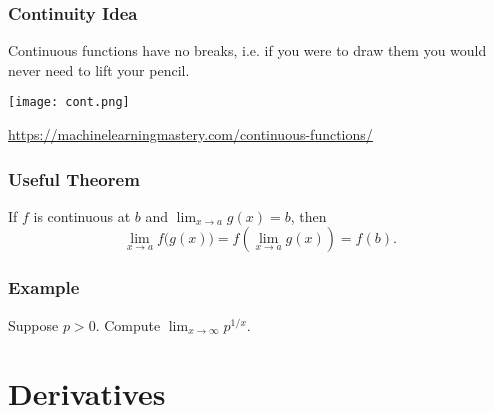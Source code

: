 \documentclass{beamer}
\begin{document}
\begin{frame}
\frametitle{Continuity Idea}
Continuous functions have no breaks, i.e. if you were to draw them you would never need to lift your pencil. 
\begin{center}
\texttt{[image: cont.png]}
\end{center}
\url{https://machinelearningmastery.com/continuous-functions/}
\end{frame}

\begin{frame}
\frametitle{Useful Theorem}
\begin{Theorem}
If $f$ is continuous at $b$ and $\displaystyle\lim_{x\to a} g(x) = b$, then
$$
\lim_{x\to a} f\Big(g(x)\Big) = f\left(\lim_{x\to a} g(x)\right) = f(b).
$$
\end{Theorem}
\end{frame}

\begin{frame}[t]
\frametitle{Example}
\begin{Example}
Suppose $p > 0$. Compute $\displaystyle\lim_{x\to\infty} p^{1/x}$.
\end{Example}
\end{frame}




\section{Derivatives} 
\end{document}
